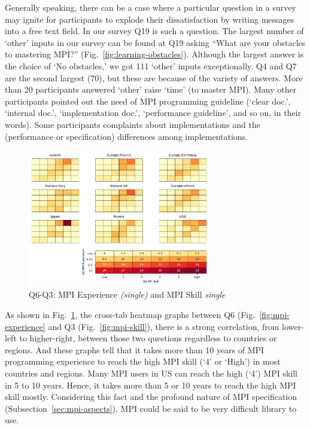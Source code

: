 \documentclass[conference,10pt,letterpaper]{IEEEtran}
\def\myquote#1{`#1'}
\begin{document}
Generally speaking, there can be a case where a particular question in
a survey may ignite for participants to explode their dissatisfaction
by writing messages into a free text field. In our survey Q19 is
such a question. The 
largest number of \myquote{other} inputs in our survey can be found 
at Q19 asking ``What are your obstacles to mastering MPI?''
(Fig.~\ref{fig:learning-obstacles}). Although the largest answer is
the choice of \myquote{No obstacles,} we got 111 \myquote{other} inputs
exceptionally. Q4 and Q7 are the second largest (70), but these are
because of the variety of answers. 
More than 20 participants answered \myquote{other} raise
\myquote{time} (to master MPI). Many other participants pointed 
out the need of MPI programming guideline (\myquote{clear doc.},
\myquote{internal doc.}, \myquote{implementation 
  doc.}, \myquote{performance guideline}, and so on, in their words).
Some participants complaints about implementations and the
(performance or specification) differences among implementations.  

\begin{figure}[htb]
\begin{center}
\includegraphics[width=8cm]{Figs/Q6-Q3.pdf}
\caption{Q6-Q3: MPI Experience {\it(single)} and MPI Skill {\it single}}
\label{fig:experience-and-skill}
\end{center}
\end{figure}

As shown in Fig.~\ref{fig:experience-and-skill}, the cross-tab heatmap
graphs between Q6 (Fig.~\ref{fig:mpi-experience} and Q3
(Fig.~\ref{fig:mpi-skill}), there is a strong correlation, from
lower-left to higher-right, between those
two questions regardless to countries or regions. And these graphs
tell that it takes more than 10 years of MPI programming experience to
reach the high MPI skill (\myquote{4} or \myquote{High}) in most
countries and regions. Many MPI users in US can reach the high
(\myquote{4}) MPI skill in 5 to 10 years. Hence, it takes more than 5
or 10 years to reach the high MPI skill mostly. Considering this fact
and the profound nature of MPI specification
(Subsection~\ref{sec:mpi-aspects}), MPI could be said to be very
difficult library to use. 
\end{document}
